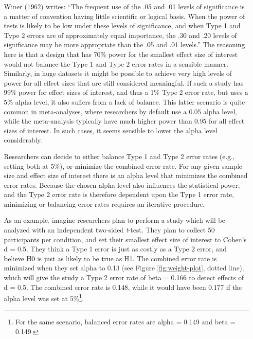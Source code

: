 \documentclass[
  english,
  ,jou, a4paper,floatsintext]{apa6}
\begin{document}
Winer (1962) writes: ``The frequent use of the .05 and .01 levels of significance is a matter of convention having little scientific or logical basis. When the power of tests is likely to be low under these levels of significance, and when Type 1 and Type 2 errors are of approximately equal importance, the .30 and .20 levels of significance may be more appropriate than the .05 and .01 levels.'' The reasoning here is that a design that has 70\% power for the smallest effect size of interest would not balance the Type 1 and Type 2 error rates in a sensible manner. Similarly, in huge datasets it might be possible to achieve very high levels of power for all effect sizes that are still considered meaningful. If such a study has 99\% power for effect sizes of interest, and thus a 1\% Type 2 error rate, but uses a 5\% alpha level, it also suffers from a lack of balance. This latter scenario is quite common in meta-analyses, where researchers by default use a 0.05 alpha level, while the meta-analysis typically have much higher power than 0.95 for all effect sizes of interest. In such cases, it seems sensible to lower the alpha level considerably.

Researchers can decide to either balance Type 1 and Type 2 error rates (e.g., setting both at 5\%), or minimize the combined error rate. For any given sample size and effect size of interest there is an alpha level that minimizes the combined error rates. Because the chosen alpha level also influences the statistical power, and the Type 2 error rate is therefore dependent upon the Type 1 error rate, minimizing or balancing error rates requires an iterative procedure.

As an example, imagine researchers plan to perform a study which will be analyzed with an independent two-sided \emph{t}-test. They plan to collect 50 participants per condition, and set their smallest effect size of interest to Cohen's d = 0.5. They think a Type 1 error is just as costly as a Type 2 error, and believe H0 is just as likely to be true as H1. The combined error rate is minimized when they set alpha to 0.13 (see Figure \ref{fig:weight-plot}, dotted line), which will give the study a Type 2 error rate of beta = 0.166 to detect effects of d = 0.5. The combined error rate is 0.148, while it would have been 0.177 if the alpha level was set at 5\%\footnote{For the same scenario, balanced error rates are alpha = 0.149 and beta = 0.149.}.
\end{document}
